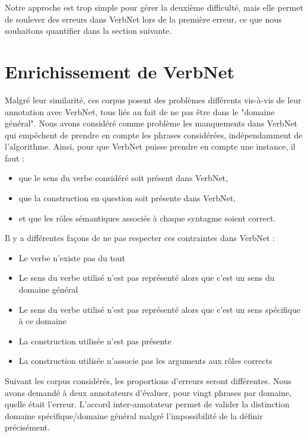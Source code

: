 Notre approche est trop simple pour gérer la deuxième difficulté, mais elle
permet de soulever des erreurs dans VerbNet lors de la première erreur, ce que
nous souhaitons quantifier dans la section suivante.

\section{Enrichissement de VerbNet}
\label{sec:enrichissement_verbnet}

Malgré leur similarité, ces corpus posent des problèmes différents vis-à-vis de
leur annotation avec VerbNet, tous liés au fait de ne pas être dans le "domaine
général". Nous avons considéré comme problème les manquements dans VerbNet qui
empêchent de prendre en compte les phrases considérées, indépendamment de
l'algorithme. Ainsi, pour que VerbNet puisse prendre en compte une instance, il
faut :

\begin{itemize}
    \item que le sens du verbe considéré soit présent dans VerbNet,
    \item que la construction en question soit présente dans VerbNet,
    \item et que les rôles sémantiques associés à chaque syntagme soient correct.
\end{itemize}

Il y a différentes façons de ne pas respecter ces contraintes dans VerbNet :

\begin{itemize}

    \item Le verbe n'existe pas du tout

    \item Le sens du verbe utilisé n'est pas représenté alors que c'est un sens
        du domaine général

    \item Le sens du verbe utilisé n'est pas représenté alors que c'est un sens
        spécifique à ce domaine

    \item La construction utilisée n'est pas présente

    \item La construction utilisée n'associe pas les arguments aux rôles
        corrects

\end{itemize}

Suivant les corpus considérés, les proportions d'erreurs seront différentes.
Nous avons demandé à deux annotateurs d'évaluer, pour vingt phrases par
domaine, quelle était l'erreur. L'accord inter-annotateur permet de valider la
distinction domaine spécifique/domaine général malgré l'impossibilité de la
définir précisément.

